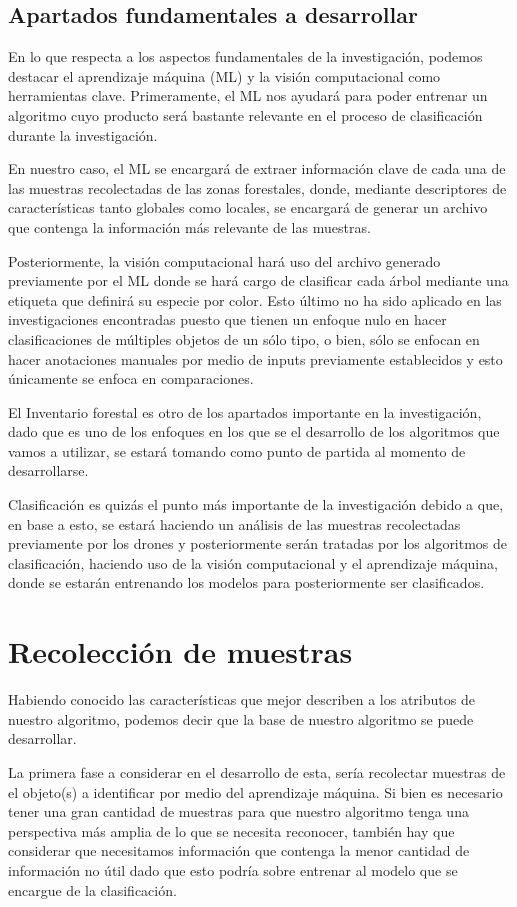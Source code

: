 \section{Apartados fundamentales a desarrollar}
En lo que respecta a los aspectos fundamentales de la investigación, podemos destacar el aprendizaje máquina (ML) y la visión computacional como herramientas clave. Primeramente, el ML nos ayudará para poder entrenar un algoritmo cuyo producto será bastante relevante en el proceso de clasificación durante la investigación.

En nuestro caso, el ML se encargará de extraer información clave de cada una de las muestras recolectadas de las zonas forestales, donde, mediante descriptores de características tanto globales como locales, se encargará de generar un archivo que contenga la información más relevante de las muestras.

Posteriormente, la visión computacional hará uso del archivo generado previamente por el ML donde se hará cargo de clasificar cada árbol mediante una etiqueta que definirá su especie por color. Esto último no ha sido aplicado en las investigaciones encontradas puesto que tienen un enfoque nulo en hacer clasificaciones de múltiples objetos de un sólo tipo, o bien, sólo se enfocan en hacer anotaciones manuales por medio de inputs previamente establecidos y esto únicamente se enfoca en comparaciones.

El Inventario forestal es otro de los apartados importante en la investigación, dado que es uno de los enfoques en los que se el desarrollo de los algoritmos que vamos a utilizar, se estará tomando como punto de partida al momento de desarrollarse. 

Clasificación es quizás el punto más importante de la investigación debido a que, en base a esto, se estará haciendo un análisis de las muestras recolectadas previamente por los drones y posteriormente serán tratadas por los algoritmos de clasificación, haciendo uso de la visión computacional y el aprendizaje máquina, donde se estarán entrenando los modelos para posteriormente ser clasificados.


\chapter{Recolección de muestras}
Habiendo conocido las características que mejor describen a los atributos de nuestro algoritmo, podemos decir que la base de nuestro algoritmo se puede desarrollar.

La primera fase a considerar en el desarrollo de esta, sería recolectar muestras de el objeto(s) a identificar por medio del aprendizaje máquina. Si bien es necesario tener una gran cantidad de muestras para que nuestro algoritmo tenga una perspectiva más amplia de lo que se necesita reconocer, también hay que considerar que necesitamos información que contenga la menor cantidad de información no útil dado que esto podría sobre entrenar al modelo que se encargue de la clasificación.

